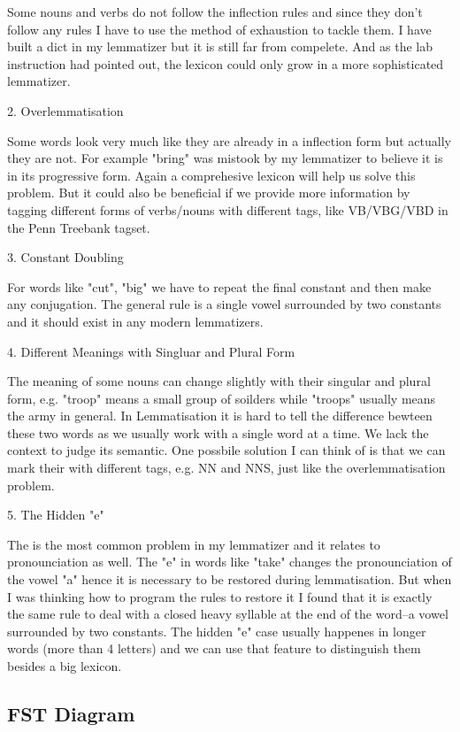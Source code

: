 \documentclass[11pt]{article} %
\begin{document}
Some nouns and verbs do not follow the inflection rules and since they don't follow any rules I have to use the method of exhaustion to tackle them. I have built a dict in my lemmatizer but it is still far from compelete. And as the lab instruction had pointed out, the lexicon could only grow in a more sophisticated lemmatizer.

2. Overlemmatisation

Some words look very much like they are already in a inflection form but actually they are not. For example "bring" was mistook by my lemmatizer to believe it is in its progressive form. Again a comprehesive lexicon will help us solve this problem. But it could also be beneficial if we provide more information by tagging different forms of verbs/nouns with different tags, like VB/VBG/VBD in the Penn Treebank tagset.

3. Constant Doubling

For words like "cut", "big" we have to repeat the final constant and then make any conjugation. The general rule is a single vowel surrounded by two constants and it should exist in any modern lemmatizers.

4. Different Meanings with Singluar and Plural Form

The meaning of some nouns can change slightly with their singular and plural form, e.g. "troop" means a small group of soilders while "troops" usually means the army in general. In Lemmatisation it is hard to tell the difference bewteen these two words as we usually work with a single word at a time. We lack the context to judge its semantic. One possbile solution I can think of is that we can mark their with different tags, e.g. NN and NNS, just like the overlemmatisation problem.

5. The Hidden "e"

The is the most common problem in my lemmatizer and it relates to pronounciation as well. The "e" in words like "take" changes the pronounciation of the vowel "a" hence it is necessary to be restored during lemmatisation. But when I was thinking how to program the rules to restore it I found that it is exactly the same rule to deal with a closed heavy syllable at the end of the word--a vowel surrounded by two constants. The hidden "e" case usually happenes in longer words (more than 4 letters) and we can use that feature to distinguish them besides a big lexicon.

\subsection{FST Diagram}
\end{document}
